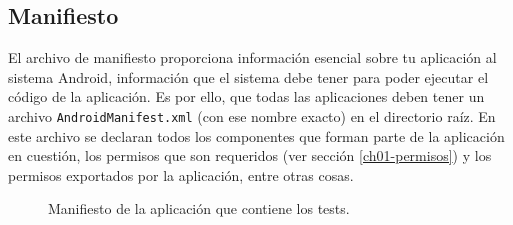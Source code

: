 \subsection{Manifiesto}
El archivo de manifiesto proporciona información esencial sobre tu aplicación al sistema Android, información que el sistema debe tener para poder ejecutar el código de la aplicación. Es por ello, que todas las aplicaciones deben tener un archivo \texttt{AndroidManifest.xml} (con ese nombre exacto) en el directorio raíz. En este archivo se declaran todos los componentes que forman parte de la aplicación en cuestión, los permisos que son requeridos (ver sección \ref{ch01-permisos}) y los permisos exportados por la aplicación, entre otras cosas.
\begin{figure}[hbtp]
    \centering
    
    \caption{Manifiesto de la aplicación que contiene los tests.}
    \label{fig:ch01:manifest}
\end{figure}